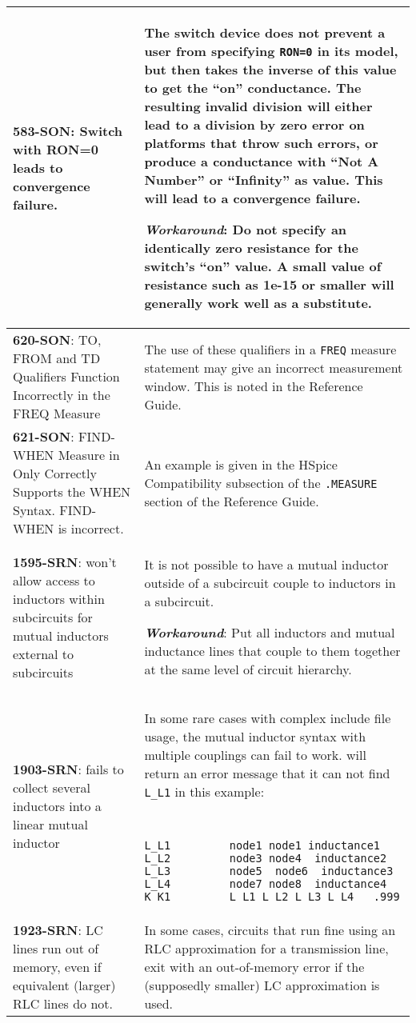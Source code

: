 \begin{longtable}[h] {>{\raggedright\small}m{2in}|>{\raggedright\let\\\tabularnewline\small}m{3.5in}}
\textbf{583-SON}: Switch with RON=0 leads to convergence failure. &  The switch device does not prevent a user from specifying \texttt{RON=0} in its model, but then takes the inverse of this value to get the ``on'' conductance.  The resulting invalid division will either lead to a division by zero error on platforms that throw such errors, or produce a conductance with ``Not A Number'' or ``Infinity'' as value.  This will lead to a convergence failure.

\textbf{\textit{Workaround}}: Do not specify an identically zero resistance for the switch's ``on'' value.  A small value of resistance such as 1e-15 or smaller will generally work well as a substitute. \\ \hline

\textbf{620-SON}: TO, FROM and TD Qualifiers Function Incorrectly in the FREQ Measure &
The use of these qualifiers in a {\tt FREQ} measure statement may give an incorrect
measurement window.  This is noted in the Reference Guide. \\ \hline

\textbf{621-SON}: FIND-WHEN Measure in \Xyce{} Only Correctly Supports the WHEN Syntax. 
FIND-WHEN is incorrect. & An example is given in the HSpice Compatibility subsection of
the {\tt .MEASURE} section of the Reference Guide. \\ \hline

\textbf{1595-SRN}: \Xyce{} won't allow access to inductors within subcircuits for
mutual inductors external to subcircuits & It is not possible to have a mutual
inductor outside of a subcircuit couple to inductors in a subcircuit.

\textbf{\textit{Workaround}}: Put all inductors and mutual inductance lines that couple to
them together at the same level of circuit hierarchy.
\\ \hline


\textbf{1903-SRN}: \Xyce{} fails to collect several inductors into a linear mutual inductor &
In some rare cases with complex include file usage, the mutual inductor syntax with multiple couplings can fail to work. \Xyce{} will return an error message that it can not find 
\texttt{L\_L1} in this example:
{\tt
\begin{verbatim}
L_L1         node1 node1 inductance1
L_L2         node3 node4  inductance2
L_L3         node5  node6  inductance3
L_L4         node7 node8  inductance4
K_K1         L_L1 L_L2 L_L3 L_L4   .999 
\end{verbatim}
}

\\ \hline


\textbf{1923-SRN}: LC lines run out of memory, even if equivalent (larger) RLC
lines do not. &  In some cases, circuits that run fine using an RLC approximation for a
transmission line, exit with an out-of-memory error if the (supposedly smaller) LC
approximation is used.
\\ \hline

\end{longtable}

